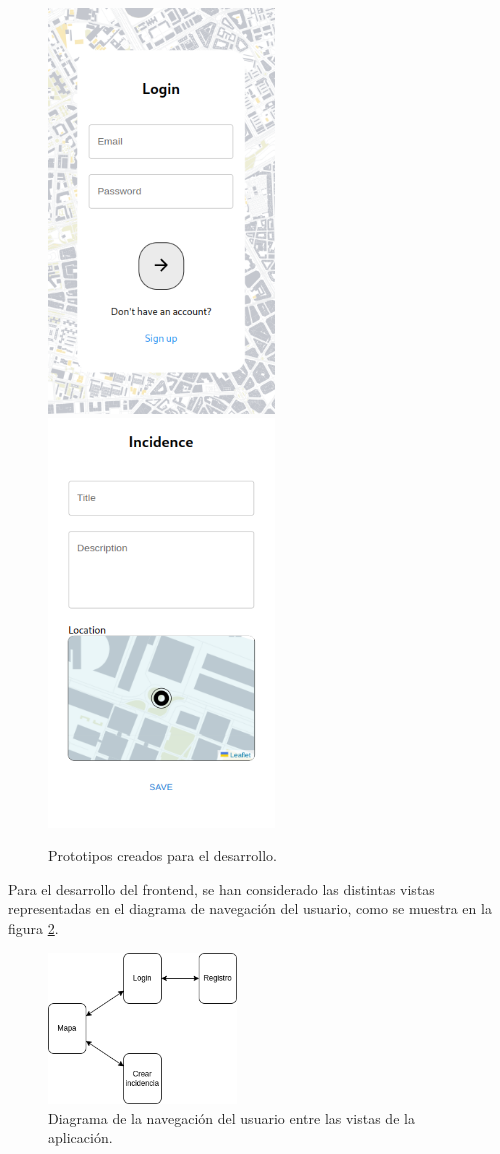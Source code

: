 \documentclass{article}
\begin{document}
\begin{figure}[H]
    \center
    \includegraphics[width=6cm]{images/login.png}
    \includegraphics[width=6cm]{images/crear_incidencia.png}
    \caption{Prototipos creados para el desarrollo.}
    \label{fig:prototipos-creados}
\end{figure}

Para el desarrollo del frontend, se han considerado las distintas vistas representadas en el diagrama de navegación del usuario, como se muestra en la figura \ref{fig:diagrama_navegacion_usuario}.

\begin{figure}[H]
\centering
\includegraphics[width=5cm]{images/diagrama_vistas.png}
\caption{Diagrama de la navegación del usuario entre las vistas de la aplicación.}
\label{fig:diagrama_navegacion_usuario}
\end{figure}
\end{document}
